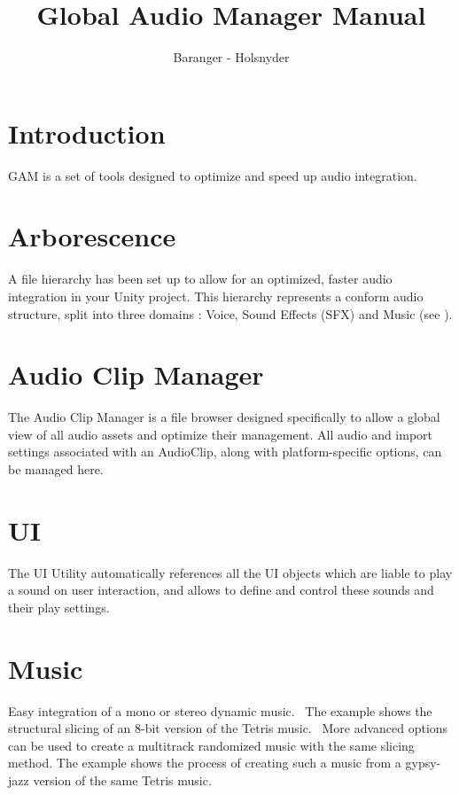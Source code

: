 \documentclass[a4paper,10pt]{article}
\begin{document}
\title{Global Audio Manager Manual}
\author{Baranger - Holsnyder}
\maketitle

\clearpage


\tableofcontents %

\clearpage



\section*{Introduction}

GAM is a set of tools designed to optimize and speed up audio integration.

\section{Arborescence}

A file hierarchy has been set up to allow for an optimized, faster audio integration in your Unity project. This hierarchy represents a conform audio structure, split into three domains : Voice, Sound Effects (SFX) and Music (see ).


\section{Audio Clip Manager}

The Audio Clip Manager is a file browser designed specifically to allow a global view of all audio assets and optimize their management. All audio and import settings associated with an AudioClip, along with platform-specific options, can be managed here.


\section{UI}

The UI Utility automatically references all the UI objects which are liable to play a sound on user interaction, and allows to define and control these sounds and their play settings.


\section{Music}

Easy integration of a mono or stereo dynamic music. \
The example shows the structural slicing of an 8-bit version of the Tetris music. \
More advanced options can be used to create a multitrack randomized music with the same slicing method. The example shows the process of creating such a music from a gypsy-jazz version of the same Tetris music.
\end{document}
